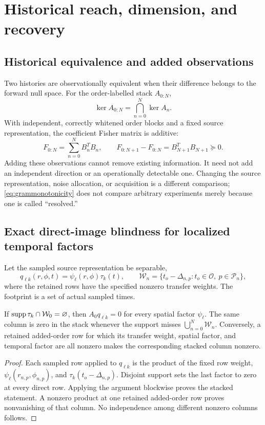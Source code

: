 \section{Historical reach, dimension, and recovery}\label{sec:information}
\subsection{Historical equivalence and added observations}
Two histories are observationally equivalent when their difference belongs to the forward null space. For the order-labelled stack $A_{0:N}$,
\begin{equation}
\ker A_{0:N}=\bigcap_{n=0}^N\ker A_n.
\label{eq:nullintersection}
\end{equation}
With independent, correctly whitened order blocks and a fixed source representation, the coefficient Fisher matrix is additive:
\begin{equation}
F_{0:N}=\sum_{n=0}^N B_n^TB_n,\qquad
F_{0:N+1}-F_{0:N}=B_{N+1}^TB_{N+1}\succeq0.
\label{eq:grammonotonicity}
\end{equation}
Adding these observations cannot remove existing information. It need not add an independent direction or an operationally detectable one. Changing the source representation, noise allocation, or acquisition is a different comparison; \eqref{eq:grammonotonicity} does not compare arbitrary experiments merely because one is called ``resolved.''

\subsection{Exact direct-image blindness for localized temporal factors}
Let the sampled source representation be separable,
\begin{equation}
q_{\ell k}(r,\phi,t)=\psi_\ell(r,\phi)\tau_k(t),\qquad
\mathcal W_n=\{t_o-\Delta_{n,p}:t_o\in\mathcal O,\ p\in\mathcal P_n\},
\label{eq:supportbasis}
\end{equation}
where the retained rows have the specified nonzero transfer weights. The footprint is a set of actual sampled times.

\begin{theorem}\label{thm:support}
If $\operatorname{supp}\tau_k\cap\mathcal W_0=\varnothing$, then $A_0q_{\ell k}=0$ for every spatial factor $\psi_\ell$. The same column is zero in the stack whenever the support misses $\bigcup_{n=0}^N\mathcal W_n$. Conversely, a retained added-order row for which its transfer weight, spatial factor, and temporal factor are all nonzero makes the corresponding stacked column nonzero.
\end{theorem}
\begin{proof}
Each sampled row applied to $q_{\ell k}$ is the product of the fixed row weight, $\psi_\ell(r_{n,p},\phi_{n,p})$, and $\tau_k(t_o-\Delta_{n,p})$. Disjoint support sets the last factor to zero at every direct row. Applying the argument blockwise proves the stacked statement. A nonzero product at one retained added-order row proves nonvanishing of that column. No independence among different nonzero columns follows.
\end{proof}

